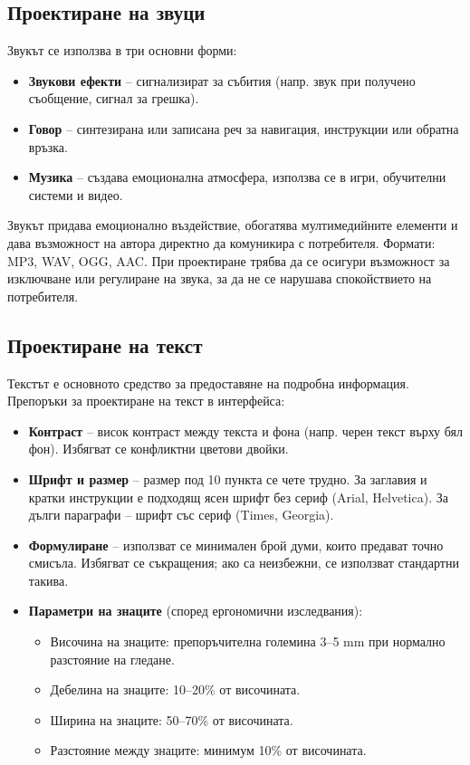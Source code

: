 \documentclass{scrartcl}
\begin{document}
\begin{FlushLeft}
\subsection{Проектиране на звуци}

Звукът се използва в три основни форми:
\begin{itemize}
    \item \textbf{Звукови ефекти} – сигнализират за събития (напр. звук при получено съобщение, сигнал за грешка).
    \item \textbf{Говор} – синтезирана или записана реч за навигация, инструкции или обратна връзка.
    \item \textbf{Музика} – създава емоционална атмосфера, използва се в игри, обучителни системи и видео.
\end{itemize}
Звукът придава емоционално въздействие, обогатява мултимедийните елементи и дава възможност на автора директно да комуникира с потребителя. Формати: MP3, WAV, OGG, AAC. При проектиране трябва да се осигури възможност за изключване или регулиране на звука, за да не се нарушава спокойствието на потребителя.

\subsection{Проектиране на текст}

Текстът е основното средство за предоставяне на подробна информация. Препоръки за проектиране на текст в интерфейса:
\begin{itemize}
    \item \textbf{Контраст} – висок контраст между текста и фона (напр. черен текст върху бял фон). Избягват се конфликтни цветови двойки.
    \item \textbf{Шрифт и размер} – размер под 10 пункта се чете трудно. За заглавия и кратки инструкции е подходящ ясен шрифт без сериф (Arial, Helvetica). За дълги параграфи – шрифт със сериф (Times, Georgia).
    \item \textbf{Формулиране} – използват се минимален брой думи, които предават точно смисъла. Избягват се съкращения; ако са неизбежни, се използват стандартни такива.
    \item \textbf{Параметри на знаците} (според ергономични изследвания):
    \begin{itemize}
        \item Височина на знаците: препоръчителна големина 3–5 mm при нормално разстояние на гледане.
        \item Дебелина на знаците: 10–20\% от височината.
        \item Ширина на знаците: 50–70\% от височината.
        \item Разстояние между знаците: минимум 10\% от височината.
    \end{itemize}
\end{itemize}


\end{FlushLeft}
\end{document}

